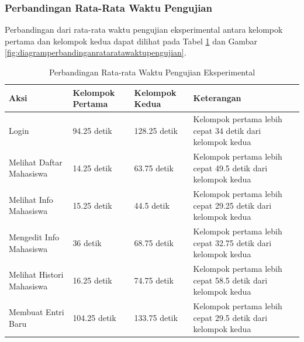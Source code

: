 \subsubsection{Perbandingan Rata-Rata Waktu Pengujian}
\label{perbandinganrataratawaktupengujian}

Perbandingan dari rata-rata waktu pengujian eksperimental antara
kelompok pertama dan kelompok kedua dapat dilihat pada Tabel
\ref{tab:perbandinganrataratawaktu} dan Gambar
\ref{fig:diagramperbandinganrataratawaktupengujian}.

\begin{table}[h]
\centering
\caption[Tabel Perbandingan Rata-rata Waktu Pengujian
Eksperimental]{Perbandingan Rata-rata Waktu Pengujian Eksperimental}
\label{tab:perbandinganrataratawaktu}
\begin{tabular}{|p{3cm}|l|l|p{3cm}|}
\hline
Aksi & Kelompok Pertama & Kelompok Kedua & Keterangan\\
\hline
Login & 94.25 detik & 128.25 detik & Kelompok pertama lebih cepat 34 detik
dari kelompok kedua\\
\hline
Melihat Daftar Mahasiswa & 14.25 detik & 63.75 detik & Kelompok pertama lebih
cepat 49.5 detik dari kelompok kedua\\
\hline
Melihat Info Mahasiswa & 15.25 detik & 44.5 detik & Kelompok pertama lebih cepat
29.25 detik dari kelompok kedua\\
\hline
Mengedit Info Mahasiswa & 36 detik & 68.75 detik & Kelompok pertama lebih cepat
32.75 detik dari kelompok kedua\\
\hline
Melihat Histori Mahasiswa & 16.25 detik & 74.75 detik & Kelompok pertama lebih
cepat 58.5 detik dari kelompok kedua\\
\hline
Membuat Entri Baru & 104.25 detik & 133.75 detik & Kelompok pertama lebih cepat
29.5 detik dari kelompok kedua\\
\hline
\end{tabular}
\end{table}

\newcommand{\slice}[4]{
  \pgfmathparse{0.5*#1+0.5*#2}
  \let\midangle\pgfmathresult

  \draw[thick,fill=black!10] (0,0) -- (#1:1) arc (#1:#2:1) -- cycle;

  \node[label=\midangle:#4] at (\midangle:1) {};

  \pgfmathparse{min((#2-#1-10)/110*(-0.3),0)}
  \let\temp\pgfmathresult
  \pgfmathparse{max(\temp,-0.5) + 0.8}
  \let\innerpos\pgfmathresult
  \node at (\midangle:\innerpos) {#3};
}


